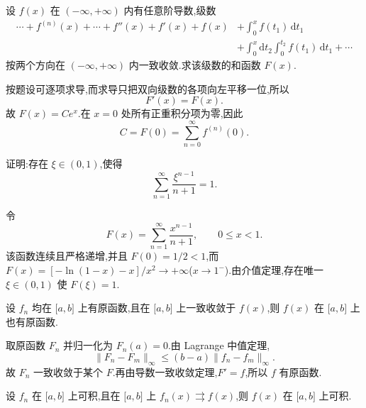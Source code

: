 \begin{example}
    设 $f(x)$ 在 $(-\infty,+\infty)$ 内有任意阶导数,级数
    \[
        \begin{aligned}
            \cdots+f^{(n)}(x)+\cdots+f''(x)+f'(x)+f(x)
             & +\int_0^xf(t_1)\,\mathrm{d}t_1                                 \\
             & +\int_0^x\mathrm{d}t_2\int_0^{t_2}f(t_1)\,\mathrm{d}t_1+\cdots
        \end{aligned}
    \]
    按两个方向在 $(-\infty,+\infty)$ 内一致收敛.求该级数的和函数 $F(x)$.
\end{example}
\exampleblank

\begin{solution}
    按题设可逐项求导,而求导只把双向级数的各项向左平移一位,所以
    \[
        F'(x)=F(x).
    \]
    故 $F(x)=Ce^x$.在 $x=0$ 处所有正重积分项为零,因此
    \[
        C=F(0)=\sum\limits_{n=0}^{\infty}f^{(n)}(0).
    \]
\end{solution}

\begin{example}
    证明:存在 $\xi\in(0,1)$,使得
    \[
        \displaystyle\sum\limits_{n=1}^{\infty}\dfrac{\xi^{n-1}}{n+1}=1.
    \]
\end{example}
\exampleblank

\begin{solution}
    令
    \[
        F(x)=\sum\limits_{n=1}^{\infty}\dfrac{x^{n-1}}{n+1},\qquad0\leq x<1.
    \]
    该函数连续且严格递增,并且 $F(0)=1/2<1$,而
    $F(x)=[-\ln(1-x)-x]/x^2\to+\infty$($x\to1^-$).由介值定理,存在唯一 $\xi\in(0,1)$ 使 $F(\xi)=1$.
\end{solution}

\begin{example}[\markstar]
    设 $f_n$ 均在 $\lbrack a,b\rbrack$ 上有原函数,且在 $\lbrack a,b\rbrack$ 上一致收敛于 $f(x)$,则 $f(x)$ 在 $\lbrack a,b\rbrack$ 上也有原函数.
\end{example}
\exampleblank

\begin{solution}
    取原函数 $F_n$ 并归一化为 $F_n(a)=0$.由 Lagrange 中值定理,
    \[
        \|F_n-F_m\|_\infty\leq(b-a)\|f_n-f_m\|_\infty.
    \]
    故 $F_n$ 一致收敛于某个 $F$.再由导数一致收敛定理,$F'=f$,所以 $f$ 有原函数.
\end{solution}

\begin{example}[\markstar]
    设 $f_n$ 在 $\lbrack a,b\rbrack$ 上可积,且在 $\lbrack a,b\rbrack$ 上 $f_n(x)\rightrightarrows f(x)$,则 $f(x)$ 在 $\lbrack a,b\rbrack$ 上可积.
\end{example}
\exampleblank

